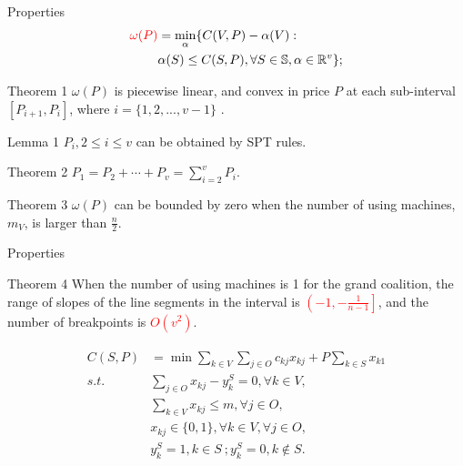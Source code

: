 \documentclass[14pt]{beamer}
\begin{document}
\begin{frame}{Properties}
	\vspace{-10mm}
	\small
		\begin{eqnarray*}
		\textcolor{red}{\omega(P)}& =\mathop{\min}_{\alpha}\{C(V,P)-\alpha(V): \\
		 &\alpha(S)\leq C(S,P),\forall S \in \mathbb{S}, \alpha\in\mathbb{R}^{v}\};
		\end{eqnarray*}
		\vspace{-10mm}
		\footnotesize
		\begin{block}{Theorem 1}
		${\omega(P)}$ is piecewise linear, and convex in price $P$ at each sub-interval $[P_{i+1},P_i]$, where $i=\{1,2,...,v-1\}$ .
		\end{block}

		\begin{block}{Lemma 1}
		$P_i, 2 \leq i \leq v$ can be obtained by SPT rules.
		\end{block}

		\begin{block}{Theorem 2}
		$P_{1}=P_{2}+\cdots+P_{v}=\sum_{i=2}^v P_i$.
		\end{block}

		\begin{block}{Theorem 3}
		$\omega(P)$ can be bounded by zero when the number of using machines, $m_V$, is larger than $\frac{n}{2}$.
		\end{block}
\end{frame}


\begin{frame}{Properties}
	\vspace{-1mm}
	\small
		\begin{block}{Theorem 4}
			When the number of using machines is 1 for the grand coalition, the range of slopes of the line segments in the interval is \textcolor{red}{$\left( -1 , -\frac{1}{n-1} \right]$}, and the number of breakpoints is \textcolor{red}{$ O(v^2)$}.
		\end{block}

		\begin{definition}
		\small
		\begin{eqnarray*}\label{eqn:IVPU}
		\begin{aligned}
		C(S,P)   &= {\min} \sum_{k\in V}\sum_{j\in O} {c_{kj} x_{kj}} + {P\sum_{k\in S} x_{k1}} \\
		{s.t.}\quad & \sum_{j \in O} x_{kj}-y_k^S=0, \forall k \in V, \\
		& \sum_{k\in V} x_{kj} \leq m,\forall j \in O,  \\
		& x_{kj} \in \{0,1\} , \forall k \in V, \forall j \in O,\\
		& y_k^S=1, k \in S~; y_k^S=0, k \notin S.
		\end{aligned}
		\end{eqnarray*}
		\end{definition}

\end{frame}
\end{document}
